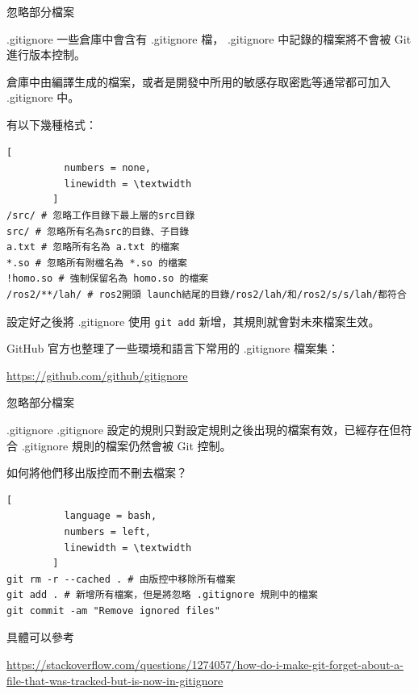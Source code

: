 \documentclass[xetex, unicode, 10pt, aspectratio=169]{beamer}
\begin{document}
\begin{frame}[fragile]{忽略部分檔案}
    \begin{block}{.gitignore}
        一些倉庫中會含有 .gitignore 檔， .gitignore 中記錄的檔案將不會被 Git 進行版本控制。

        倉庫中由編譯生成的檔案，或者是開發中所用的敏感存取密匙等通常都可加入 .gitignore 中。

        有以下幾種格式：

        \begin{lstlisting}[
          numbers = none,
          linewidth = \textwidth
        ]
/src/ # 忽略工作目錄下最上層的src目錄
src/ # 忽略所有名為src的目錄、子目錄
a.txt # 忽略所有名為 a.txt 的檔案
*.so # 忽略所有附檔名為 *.so 的檔案
!homo.so # 強制保留名為 homo.so 的檔案
/ros2/**/lah/ # ros2開頭 launch結尾的目錄/ros2/lah/和/ros2/s/s/lah/都符合\end{lstlisting}

        設定好之後將 .gitignore 使用 \texttt{git add} 新增，其規則就會對未來檔案生效。

        GitHub 官方也整理了一些環境和語言下常用的 .gitignore 檔案集：

        \underline{\href{https://github.com/github/gitignore}{https://github.com/github/gitignore}}
    \end{block}
\end{frame}

\begin{frame}[fragile]{忽略部分檔案}
    \begin{block}{.gitignore}
        .gitignore 設定的規則只對設定規則之後出現的檔案有效，已經存在但符合 .gitignore 規則的檔案仍然會被 Git 控制。

        如何將他們移出版控而不刪去檔案？
        \pause
        \begin{lstlisting}[
          language = bash,
          numbers = left,
          linewidth = \textwidth
        ]
git rm -r --cached . # 由版控中移除所有檔案
git add . # 新增所有檔案，但是將忽略 .gitignore 規則中的檔案
git commit -am "Remove ignored files"\end{lstlisting}

        具體可以參考

        \underline{\href{https://stackoverflow.com/questions/1274057/how-do-i-make-git-forget-about-a-file-that-was-tracked-but-is-now-in-gitignore}{\scriptsize
        https://stackoverflow.com/questions/1274057/how-do-i-make-git-forget-about-a-file-that-was-tracked-but-is-now-in-gitignore}}
    \end{block}

\end{frame}
\end{document}
